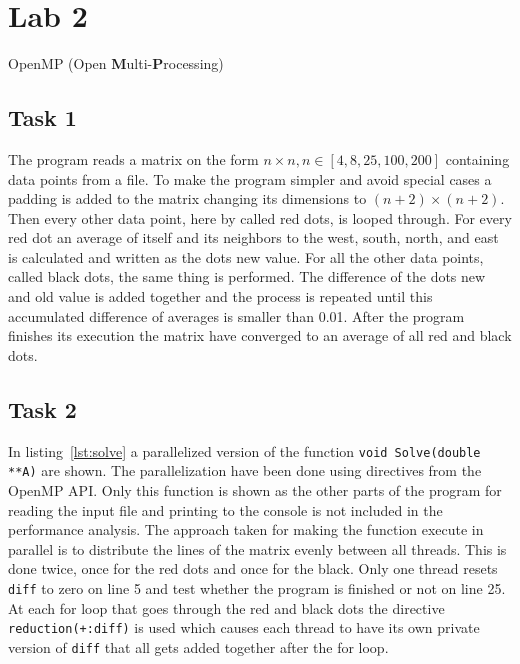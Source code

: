 \section{Lab 2}
\label{sec:lab2}
OpenMP (Open \textbf Multi-\textbf Processing)

\subsection{Task 1}

The program reads a matrix on the form $n \times n, n \in [4,8,25,100,200]$ containing data points from a file. To make the program simpler and avoid special cases a padding is added to the matrix changing its dimensions to $(n+2) \times (n+2)$. Then every other data point, here by called red dots, is looped through. For every red dot an average of itself and its neighbors to the west, south, north, and east is calculated and written as the dots new value. For all the other data points, called black dots, the same thing is performed. The difference of the dots new and old value is added together and the process is repeated until this accumulated difference of averages is smaller than 0.01. After the program finishes its execution the matrix have converged to an average of all red and black dots.


\subsection{Task 2}
In listing~\ref{lst:solve} a parallelized version of the function \texttt{void Solve(double **A)} are shown. The parallelization have been done using directives from the OpenMP API. Only this function is shown as the other parts of the program for reading the input file and printing to the console is not included in the performance analysis. The approach taken for making the function execute in parallel is to distribute the lines of the matrix evenly between all threads. This is done twice, once for the red dots and once for the black. Only one thread resets \texttt{diff} to zero on line 5 and test whether the program is finished or not on line 25. At each for loop that goes through the red and black dots the directive \texttt{reduction(+:diff)} is used which causes each thread to have its own private version of \texttt{diff} that all gets added together after the for loop.

